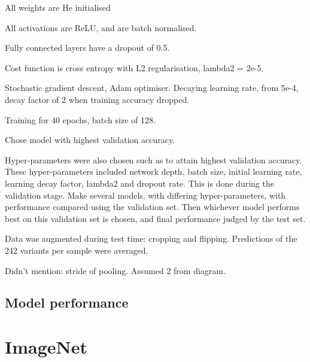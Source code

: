All weights are He initialised 

All activations are ReLU, and are batch normalised.

Fully connected layers have a dropout of 0.5.

Cost function is cross entropy with L2 regularisation, lambda2 = 2e-5. 

Stochastic gradient descent, Adam optimiser. Decaying learning rate, from 5e-4, decay factor of 2 when training accuracy dropped. 

Training for 40 epochs, batch size of 128.

Chose model with highest validation accuracy. 

Hyper-parameters were also chosen such as to attain highest validation accuracy. These hyper-parameters included network depth, batch size, initial learning rate, learning decay factor, lambda2 and dropout rate. This is done during the validation stage. Make several models, with differing hyper-parameters, with performance compared using the validation set. Then whichever model performs best on this validation set is chosen, and final performance judged by the test set.

Data was augmented during test time: cropping and flipping. Predictions of the 242 variants per sample were averaged.

Didn't mention: stride of pooling. Assumed 2 from diagram.
 
\subsection{Model performance}
 
\section{ImageNet}



